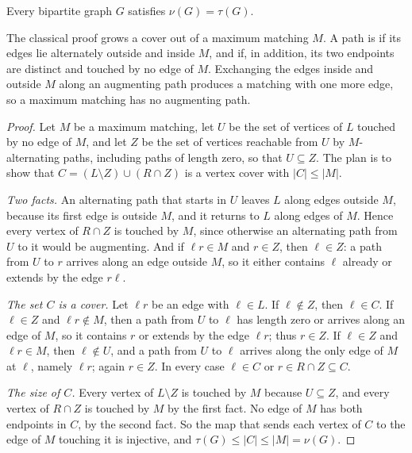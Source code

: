 \begin{refsection}
\begin{theorem}\label{thm:lpduality:konig}
Every bipartite graph $G$ satisfies $\nu(G)=\tau(G)$.
\end{theorem}

The classical proof grows a cover out of a maximum matching $M$. A path is  if its edges lie alternately outside and inside $M$, and  if, in addition, its two endpoints are distinct and touched by no edge of $M$. Exchanging the edges inside and outside $M$ along an augmenting path produces a matching with one more edge, so a maximum matching has no augmenting path.

\begin{proof}
Let $M$ be a maximum matching, let $U$ be the set of vertices of $L$ touched by no edge of $M$, and let $Z$ be the set of vertices reachable from $U$ by $M$-alternating paths, including paths of length zero, so that $U\subseteq Z$. The plan is to show that $C=(L\setminus Z)\cup(R\cap Z)$ is a vertex cover with $|C|\le|M|$.

\emph{Two facts.} An alternating path that starts in $U$ leaves $L$ along edges outside $M$, because its first edge is outside $M$, and it returns to $L$ along edges of $M$. Hence every vertex of $R\cap Z$ is touched by $M$, since otherwise an alternating path from $U$ to it would be augmenting. And if $\ell r\in M$ and $r\in Z$, then $\ell\in Z$: a path from $U$ to $r$ arrives along an edge outside $M$, so it either contains $\ell$ already or extends by the edge $r\ell$.

\emph{The set $C$ is a cover.} Let $\ell r$ be an edge with $\ell\in L$. If $\ell\notin Z$, then $\ell\in C$. If $\ell\in Z$ and $\ell r\notin M$, then a path from $U$ to $\ell$ has length zero or arrives along an edge of $M$, so it contains $r$ or extends by the edge $\ell r$; thus $r\in Z$. If $\ell\in Z$ and $\ell r\in M$, then $\ell\notin U$, and a path from $U$ to $\ell$ arrives along the only edge of $M$ at $\ell$, namely $\ell r$; again $r\in Z$. In every case $\ell\in C$ or $r\in R\cap Z\subseteq C$.

\emph{The size of $C$.} Every vertex of $L\setminus Z$ is touched by $M$ because $U\subseteq Z$, and every vertex of $R\cap Z$ is touched by $M$ by the first fact. No edge of $M$ has both endpoints in $C$, by the second fact. So the map that sends each vertex of $C$ to the edge of $M$ touching it is injective, and $\tau(G)\le|C|\le|M|=\nu(G)$.
\end{proof}


\end{refsection}
